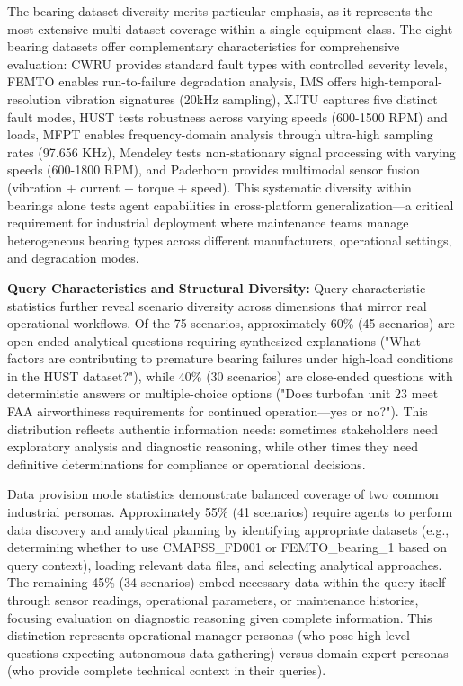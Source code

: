 \documentclass[sigconf]{acmart}
\begin{document}
The bearing dataset diversity merits particular emphasis, as it represents the most extensive multi-dataset coverage within a single equipment class. The eight bearing datasets offer complementary characteristics for comprehensive evaluation: CWRU provides standard fault types with controlled severity levels, FEMTO enables run-to-failure degradation analysis, IMS offers high-temporal-resolution vibration signatures (20kHz sampling), XJTU captures five distinct fault modes, HUST tests robustness across varying speeds (600-1500 RPM) and loads, MFPT enables frequency-domain analysis through ultra-high sampling rates (97.656 KHz), Mendeley tests non-stationary signal processing with varying speeds (600-1800 RPM), and Paderborn provides multimodal sensor fusion (vibration + current + torque + speed). This systematic diversity within bearings alone tests agent capabilities in cross-platform generalization---a critical requirement for industrial deployment where maintenance teams manage heterogeneous bearing types across different manufacturers, operational settings, and degradation modes.

\textbf{Query Characteristics and Structural Diversity:} Query characteristic statistics further reveal scenario diversity across dimensions that mirror real operational workflows. Of the 75 scenarios, approximately 60\% (45 scenarios) are open-ended analytical questions requiring synthesized explanations ("What factors are contributing to premature bearing failures under high-load conditions in the HUST dataset?"), while 40\% (30 scenarios) are close-ended questions with deterministic answers or multiple-choice options ("Does turbofan unit 23 meet FAA airworthiness requirements for continued operation---yes or no?"). This distribution reflects authentic information needs: sometimes stakeholders need exploratory analysis and diagnostic reasoning, while other times they need definitive determinations for compliance or operational decisions.

Data provision mode statistics demonstrate balanced coverage of two common industrial personas. Approximately 55\% (41 scenarios) require agents to perform data discovery and analytical planning by identifying appropriate datasets (e.g., determining whether to use CMAPSS\_FD001 or FEMTO\_bearing\_1 based on query context), loading relevant data files, and selecting analytical approaches. The remaining 45\% (34 scenarios) embed necessary data within the query itself through sensor readings, operational parameters, or maintenance histories, focusing evaluation on diagnostic reasoning given complete information. This distinction represents operational manager personas (who pose high-level questions expecting autonomous data gathering) versus domain expert personas (who provide complete technical context in their queries).
\end{document}
